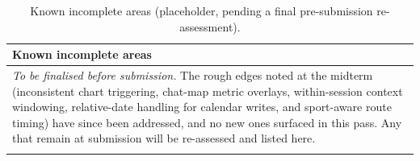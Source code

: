 \begin{table}[ht]
\begin{center}
\begin{minipage}{\textwidth}
\caption[Known incomplete areas]{Known incomplete areas (placeholder, pending a final pre-submission re-assessment).}\label{tab:known_issues}
\begin{tabularx}{\textwidth}{X}
\toprule
\textbf{Known incomplete areas} \\
\midrule
\textit{To be finalised before submission.} The rough edges noted at the midterm (inconsistent chart triggering, chat-map metric overlays, within-session context windowing, relative-date handling for calendar writes, and sport-aware route timing) have since been addressed, and no new ones surfaced in this pass. Any that remain at submission will be re-assessed and listed here. \\
\botrule
\end{tabularx}
\end{minipage}
\end{center}
\end{table}
